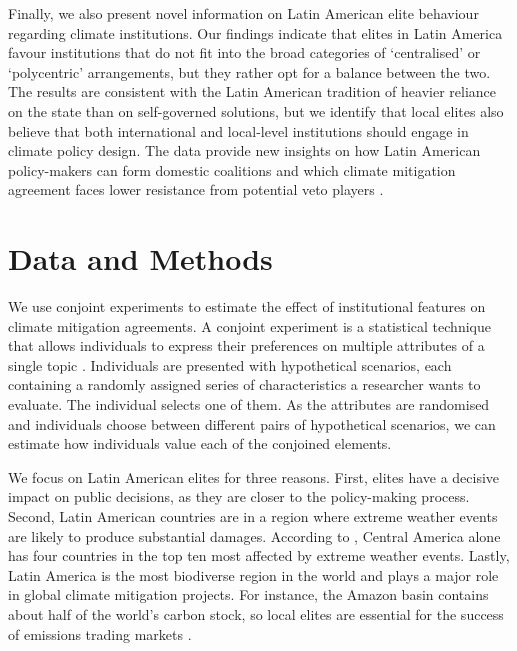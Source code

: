 \documentclass[a4paper,12pt]{article}
\begin{document}
Finally, we also present novel information on Latin American elite behaviour regarding climate institutions. Our findings indicate that elites in Latin America favour institutions that do not fit into the broad categories of `centralised' or `polycentric' arrangements, but they rather opt for a balance between the two. The results are consistent with the Latin American tradition of heavier reliance on the state than on self-governed solutions, but we identify that local elites also believe that both international and local-level institutions should engage in climate policy design. The data provide new insights on how Latin American policy-makers can form domestic coalitions and which climate mitigation agreement faces lower resistance from potential veto players \citep{beiser2019commitment, hovi2019club}.

\section{Data and Methods}%
\label{sec:data_and_methods}

We use conjoint experiments to estimate the effect of institutional features on climate mitigation agreements. A conjoint experiment is a statistical technique that allows individuals to express their preferences on multiple attributes of a single topic \citep{bansak2016economic, hainmueller2014causal}. Individuals are presented with hypothetical scenarios, each containing a randomly assigned series of characteristics a researcher wants to evaluate. The individual selects one of them. As the attributes are randomised and individuals choose between different pairs of hypothetical scenarios, we can estimate how individuals value each of the conjoined elements.

We focus on Latin American elites for three reasons. First, elites have a decisive impact on public decisions, as they are closer to the policy-making process. Second, Latin American countries are in a region where extreme weather events are likely to produce substantial damages. According to \citet{eckstein2017global}, Central America alone has four countries in the top ten most affected by extreme weather events. Lastly, Latin America is the most biodiverse region in the world and plays a major role in global climate mitigation projects. For instance, the Amazon basin contains about half of the world's carbon stock, so local elites are essential for the success of emissions trading markets \citep{benitez2006site, yang2018post}. 
\end{document}
